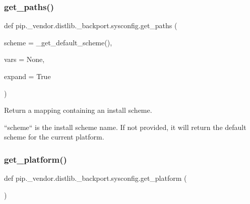 \subsubsection{\texorpdfstring{get\+\_\+paths()}{get\_paths()}}
{\footnotesize\ttfamily def pip.\+\_\+vendor.\+distlib.\+\_\+backport.\+sysconfig.\+get\+\_\+paths (\begin{DoxyParamCaption}\item[{}]{scheme = {\ttfamily \+\_\+get\+\_\+default\+\_\+scheme()},  }\item[{}]{vars = {\ttfamily None},  }\item[{}]{expand = {\ttfamily True} }\end{DoxyParamCaption})}

\begin{DoxyVerb}Return a mapping containing an install scheme.

``scheme`` is the install scheme name. If not provided, it will
return the default scheme for the current platform.
\end{DoxyVerb}
 \mbox{\label{namespacepip_1_1__vendor_1_1distlib_1_1__backport_1_1sysconfig_a571427e3fde39508adc48fe58a2d6986}} 
\subsubsection{\texorpdfstring{get\+\_\+platform()}{get\_platform()}}
{\footnotesize\ttfamily def pip.\+\_\+vendor.\+distlib.\+\_\+backport.\+sysconfig.\+get\+\_\+platform (\begin{DoxyParamCaption}{ }\end{DoxyParamCaption})}

